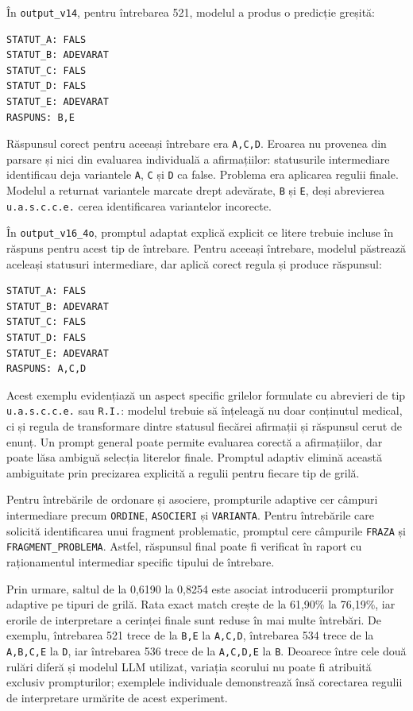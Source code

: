 \documentclass[12pt, a4paper, oneside, romanian]{teza-upb}
\begin{document}
În \texttt{output\_v14}, pentru întrebarea 521, modelul a produs o predicție greșită:

\begin{lstlisting}[basicstyle=\ttfamily\footnotesize]
STATUT_A: FALS
STATUT_B: ADEVARAT
STATUT_C: FALS
STATUT_D: FALS
STATUT_E: ADEVARAT
RASPUNS: B,E
\end{lstlisting}

Răspunsul corect pentru aceeași întrebare era \texttt{A,C,D}. Eroarea nu provenea din parsare și nici din evaluarea individuală a afirmațiilor: statusurile intermediare identificau deja variantele \texttt{A}, \texttt{C} și \texttt{D} ca false. Problema era aplicarea regulii finale. Modelul a returnat variantele marcate drept adevărate, \texttt{B} și \texttt{E}, deși abrevierea \texttt{u.a.s.c.c.e.} cerea identificarea variantelor incorecte.

În \texttt{output\_v16\_4o}, promptul adaptat explică explicit ce litere trebuie incluse în răspuns pentru acest tip de întrebare. Pentru aceeași întrebare, modelul păstrează aceleași statusuri intermediare, dar aplică corect regula și produce răspunsul:

\begin{lstlisting}[basicstyle=\ttfamily\footnotesize]
STATUT_A: FALS
STATUT_B: ADEVARAT
STATUT_C: FALS
STATUT_D: FALS
STATUT_E: ADEVARAT
RASPUNS: A,C,D
\end{lstlisting}

Acest exemplu evidențiază un aspect specific grilelor formulate cu abrevieri de tip \texttt{u.a.s.c.c.e.} sau \texttt{R.I.}: modelul trebuie să înțeleagă nu doar conținutul medical, ci și regula de transformare dintre statusul fiecărei afirmații și răspunsul cerut de enunț. Un prompt general poate permite evaluarea corectă a afirmațiilor, dar poate lăsa ambiguă selecția literelor finale. Promptul adaptiv elimină această ambiguitate prin precizarea explicită a regulii pentru fiecare tip de grilă.

Pentru întrebările de ordonare și asociere, prompturile adaptive cer câmpuri intermediare precum \texttt{ORDINE}, \texttt{ASOCIERI} și \texttt{VARIANTA}. Pentru întrebările care solicită identificarea unui fragment problematic, promptul cere câmpurile \texttt{FRAZA} și \texttt{FRAGMENT\_PROBLEMA}. Astfel, răspunsul final poate fi verificat în raport cu raționamentul intermediar specific tipului de întrebare.

Prin urmare, saltul de la 0,6190 la 0,8254 este asociat introducerii prompturilor adaptive pe tipuri de grilă. Rata exact match crește de la 61,90\% la 76,19\%, iar erorile de interpretare a cerinței finale sunt reduse în mai multe întrebări. De exemplu, întrebarea 521 trece de la \texttt{B,E} la \texttt{A,C,D}, întrebarea 534 trece de la \texttt{A,B,C,E} la \texttt{D}, iar întrebarea 536 trece de la \texttt{A,C,D,E} la \texttt{B}. Deoarece între cele două rulări diferă și modelul LLM utilizat, variația scorului nu poate fi atribuită exclusiv prompturilor; exemplele individuale demonstrează însă corectarea regulii de interpretare urmărite de acest experiment.
\end{document}
